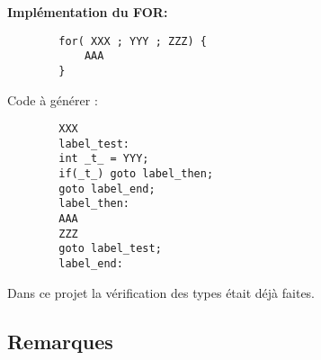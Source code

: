 \documentclass[12pt, a4paper]{article}
\begin{document}
\textbf{Implémentation du FOR:}
\begin{codequote}
    \begin{verbatim}
        for( XXX ; YYY ; ZZZ) {
            AAA
        }
    \end{verbatim}
\end{codequote}
Code à générer :
\begin{codequote}
    \begin{verbatim}
        XXX
        label_test:
        int _t_ = YYY;
        if(_t_) goto label_then;
        goto label_end;
        label_then:
        AAA
        ZZZ
        goto label_test;
        label_end:
    \end{verbatim}
\end{codequote}


Dans ce projet la vérification des types était déjà faites.

\subsection*{Remarques}
\end{document}
